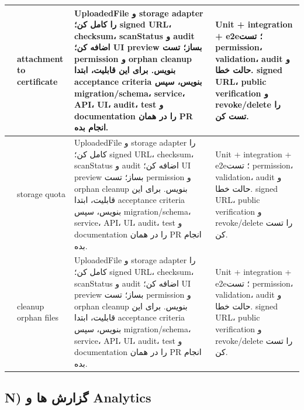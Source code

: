 \documentclass[11pt,a4paper]{article}
\begin{document}
\begin{longtable}{|>{\raggedleft\arraybackslash}p{}|>{\raggedleft\arraybackslash}p{}|>{\raggedleft\arraybackslash}p{}|>{\raggedleft\arraybackslash}p{}|}
238 & attachment to certificate & UploadedFile و storage adapter را کامل کن؛ signed URL، checksum، scanStatus و audit اضافه کن؛ UI preview بساز؛ تست permission و orphan cleanup بنویس. برای این قابلیت، ابتدا acceptance criteria بنویس، سپس migration/schema، service، API، UI، audit، test و documentation را در همان PR انجام بده. & Unit + integration + e2e؛ تست permission، validation، audit و حالت خطا. signed URL، public verification و revoke/delete را تست کن. \\ \hline
239 & storage quota & UploadedFile و storage adapter را کامل کن؛ signed URL، checksum، scanStatus و audit اضافه کن؛ UI preview بساز؛ تست permission و orphan cleanup بنویس. برای این قابلیت، ابتدا acceptance criteria بنویس، سپس migration/schema، service، API، UI، audit، test و documentation را در همان PR انجام بده. & Unit + integration + e2e؛ تست permission، validation، audit و حالت خطا. signed URL، public verification و revoke/delete را تست کن. \\ \hline
240 & cleanup orphan files & UploadedFile و storage adapter را کامل کن؛ signed URL، checksum، scanStatus و audit اضافه کن؛ UI preview بساز؛ تست permission و orphan cleanup بنویس. برای این قابلیت، ابتدا acceptance criteria بنویس، سپس migration/schema، service، API، UI، audit، test و documentation را در همان PR انجام بده. & Unit + integration + e2e؛ تست permission، validation، audit و حالت خطا. signed URL، public verification و revoke/delete را تست کن. \\ \hline
\end{longtable}
\subsection{N) گزارش ها و Analytics}
\end{document}
